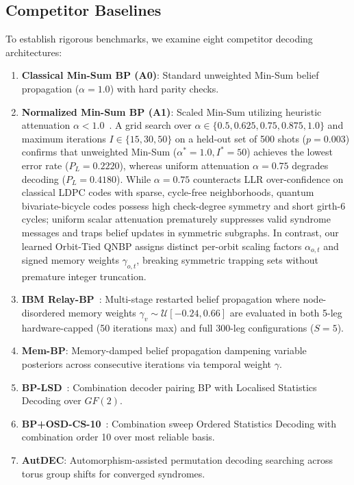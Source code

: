 \documentclass[journal]{IEEEtran}
\begin{document}
\subsection{Competitor Baselines}
To establish rigorous benchmarks, we examine eight competitor decoding architectures:
\begin{enumerate}
    \item \textbf{Classical Min-Sum BP (A0)}: Standard unweighted Min-Sum belief propagation ($\alpha=1.0$) with hard parity checks.
    \item \textbf{Normalized Min-Sum BP (A1)}: Scaled Min-Sum utilizing heuristic attenuation $\alpha < 1.0$~\cite{roffe2020decoding}. A grid search over $\alpha \in \{0.5, 0.625, 0.75, 0.875, 1.0\}$ and maximum iterations $I \in \{15, 30, 50\}$ on a held-out set of 500 shots ($p=0.003$) confirms that unweighted Min-Sum ($\alpha^* = 1.0, I^* = 50$) achieves the lowest error rate ($P_L = 0.2220$), whereas uniform attenuation $\alpha = 0.75$ degrades decoding ($P_L = 0.4180$). While $\alpha = 0.75$ counteracts LLR over-confidence on classical LDPC codes with sparse, cycle-free neighborhoods, quantum bivariate-bicycle codes possess high check-degree symmetry and short girth-6 cycles; uniform scalar attenuation prematurely suppresses valid syndrome messages and traps belief updates in symmetric subgraphs. In contrast, our learned Orbit-Tied QNBP assigns distinct per-orbit scaling factors $\alpha_{o,t}$ and signed memory weights $\gamma_{o,t}$, breaking symmetric trapping sets without premature integer truncation.
    \item \textbf{IBM Relay-BP}~\cite{muller2025relay}: Multi-stage restarted belief propagation where node-disordered memory weights $\gamma_v \sim \mathcal{U}[-0.24, 0.66]$ are evaluated in both 5-leg hardware-capped (50 iterations max) and full 300-leg configurations ($S=5$).
    \item \textbf{Mem-BP}: Memory-damped belief propagation dampening variable posteriors across consecutive iterations via temporal weight $\gamma$.
    \item \textbf{BP-LSD}~\cite{panteleev2021degenerate}: Combination decoder pairing BP with Localised Statistics Decoding over $GF(2)$.
    \item \textbf{BP+OSD-CS-10}~\cite{roffe2020decoding}: Combination sweep Ordered Statistics Decoding with combination order 10 over most reliable basis.
    \item \textbf{AutDEC}: Automorphism-assisted permutation decoding searching across torus group shifts for converged syndromes.

\end{enumerate}
\end{document}

